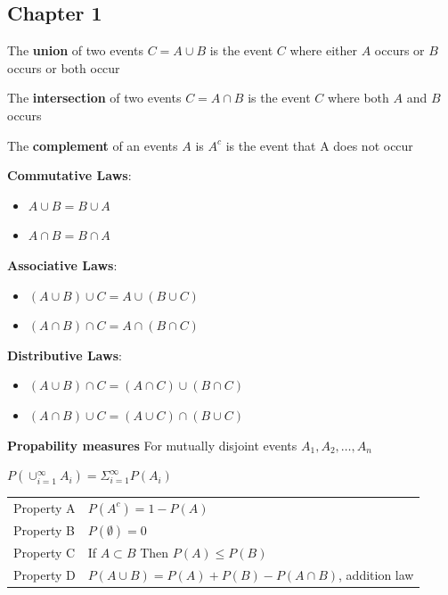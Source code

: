 \documentclass{article}
\begin{document}
\begin{multicols*}{2}

    \section{Chapter 1}
    The \textbf{union} of two events $C = A \cup B$ is the event $C$ where either $A$ occurs or $B$ occurs or both occur

    The \textbf{intersection} of two events $C = A \cap B$ is the event $C$ where both $A$ and $B$ occurs

    The \textbf{complement} of an events $A$ is $A^c$ is the event that A does not occur

    \textbf{Commutative Laws}:
    \begin{itemize}
        \item $A \cup B = B \cup A$
        \item $A \cap B = B \cap A$
    \end{itemize}

    \textbf{Associative Laws}:
    \begin{itemize}
        \item $\left(A \cup B \right) \cup C = A \cup \left( B \cup C \right)$
        \item $\left(A \cap B \right) \cap C = A \cap \left( B \cap C \right)$
    \end{itemize}

    \textbf{Distributive Laws}:
    \begin{itemize}
        \item $\left(A \cup B \right) \cap C = \left( A \cap C \right) \cup \left( B \cap C\right)$
        \item $\left(A \cap B \right) \cup C = \left( A \cup C \right) \cap \left( B \cup C\right)$
    \end{itemize}

    \textbf{Propability measures}
    For mutually disjoint events $A_1, A_2, \dots, A_n$

    $P \left( \cup^\infty_{i=1} A_i \right) = \Sigma^\infty_{i=1}P\left( A_i \right)$

    \begin{center}
        \begin{tabular}{ l p{5cm}}
            Property A & $P\left( A ^ c \right) = 1 - P \left( A \right)$                                                               \\
            Property B & $P \left( \emptyset \right) = 0$                                                                               \\
            Property C & If $ A \subset B$ Then $P \left( A \right) \leq P \left( B \right)$                                            \\
            Property D & $P \left( A \cup B\right) = P \left( A \right) + P \left( B \right) - P \left( A \cap B \right)$, addition law \\
        \end{tabular}
    \end{center}


\end{multicols*}
\end{document}
